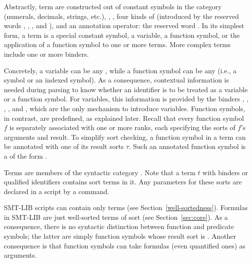 Abstractly, term are constructed out of 
constant symbols in the  category
(numerals, decimals, strings, etc.),
, 
, 
four kinds of  
(introduced by the reserved words  , , , and ),
and an annotation operator: the reserved word \ter{!}.
In its simplest form, a term is 
a special constant symbol,
a variable,
a function symbol,
or the application of a function symbol to one or more terms.
More complex terms include one or more binders.

Concretely, a variable can be any ,
while a function symbol can be any 
(i.e., a symbol or an indexed symbol).
As a consequence, contextual information is needed during parsing
to know whether an identifier is to be treated as a variable or 
a function symbol. 
For variables, this information is provided by the binders 
, , , , and , 
which are the only mechanism to introduce variables.
Function symbols, in contrast, are predefined, as explained later.
Recall that every function symbol $f$ is separately associated 
with one or more ranks,
each specifying the sorts of $f$'s arguments and result.
To simplify sort checking,
a function symbol in a term can be annotated with one of its result sorts $\tau$.
Such an annotated function symbol is a 
of the form .
\bigskip

\cTerms
\bigskip

\begin{newver}
Terms are members of the syntactic category .
Note that a term $t$ with binders or qualified identifiers contains 
sort terms in it.
Any parameters for these sorts are declared 
in a script by a command.
\end{newver}



SMT-LIB scripts can contain only  terms
(see Section~\ref{well-sortedness}).
Formulas in SMT-LIB are just well-sorted terms of sort 
 (see Section~\ref{sec:core}).
As a consequence, there is no syntactic distinction 
between function and predicate symbols;
the latter are simply function symbols whose result sort is .
Another consequence is that function symbols can take formulas 
(even quantified ones) as arguments.

